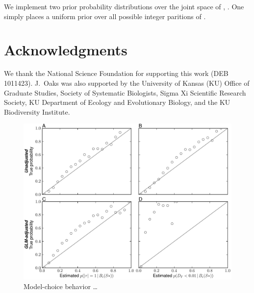 \documentclass[letterpaper,12pt]{article}
\begin{document}
\begin{linenumbers}
We implement two prior probability distributions over the joint space of
\divTimeVector, \divTimeIndexVector.
One simply places a uniform prior over all possible integer paritions of
\npairs{}.


\section*{Acknowledgments}
We thank the National Science Foundation for supporting this work (DEB
1011423).
J.\ Oaks was also supported by the University of Kansas (KU) Office of Graduate
Studies, Society of Systematic Biologists, Sigma Xi Scientific Research
Society, KU Department of Ecology and Evolutionary Biology, and the KU
Biodiversity Institute.



\newpage
\singlespacing

\renewcommand\listfigurename{Figure Captions}
\renewcommand\cftdotsep{\cftnodots}
\setlength\cftbeforefigskip{10pt}
\listoffigures


\end{linenumbers}

\newpage
\singlespacing


\clearpage

\newpage

\begin{figure}[hbtp]
    \captionsetup{listformat=figList}
    \centering
    \includegraphics[width=1.0\textwidth]{../../validation/results/dpp/pymsbayes-results/plots/prior-dpp_prior-dpp_mc_behavior.pdf}
    \caption{
        Model-choice behavior \ldots
    }
    \label{fig_dpp_dpp_val_mc}
\end{figure}
\end{document}
